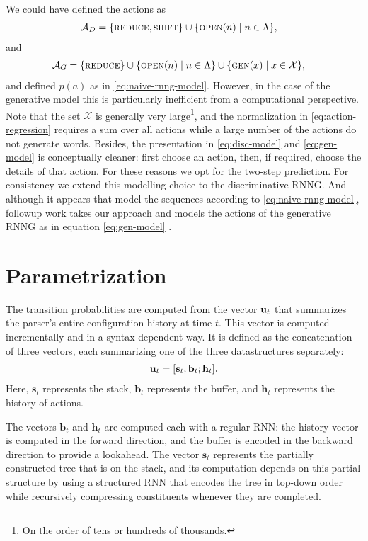 \begin{remark} We could have defined the actions as
  \begin{align*}
    \mathcal{A}_D &= \{ \textsc{reduce}, \textsc{shift} \} \cup \{ \textsc{open}(n) \mid n \in \Lambda \},
  \end{align*}
  and
  \begin{align*}
    \mathcal{A}_G &= \{ \textsc{reduce} \} \cup \{ \textsc{open}(n) \mid n \in \Lambda \} \cup \{ \textsc{gen}(x) \mid x \in \mathcal{X} \},
  \end{align*}
  and defined $p(a)$ as in \ref{eq:naive-rnng-model}. However, in the case of the generative model this is particularly inefficient from a computational perspective. Note that the set $\mathcal{X}$ is generally very large\footnote{On the order of tens or hundreds of thousands.}, and the normalization in \ref{eq:action-regression} requires a sum over all actions while a large number of the actions do not generate words. Besides, the presentation in \ref{eq:disc-model} and \ref{eq:gen-model} is conceptually cleaner: first choose an action, then, if required, choose the details of that action. For these reasons we opt for the two-step prediction. For consistency we extend this modelling choice to the discriminative RNNG. And although it appears that \citet{dyer2016rnng} model the sequences according to \ref{eq:naive-rnng-model}, followup work takes our approach and models the actions of the generative RNNG as in equation \ref{eq:gen-model} \citep{hale2018beam}.
\end{remark}


\section{Parametrization}
The transition probabilities are computed from the vector $\mathbf{u}_t$ that summarizes the parser's entire configuration history at time $t$. This vector is computed incrementally and in a syntax-dependent way. It is defined as the concatenation of three vectors, each summarizing one of the three datastructures separately:
\begin{align*}
  \mathbf{u}_t = [\mathbf{s}_t; \mathbf{b}_t; \mathbf{h}_t].
\end{align*}
Here, $\mathbf{s}_t$ represents the stack, $\mathbf{b}_t$ represents the buffer, and $\mathbf{h}_t$ represents the history of actions.

The vectors $\mathbf{b}_t$ and $\mathbf{h}_t$ are computed each with a regular RNN: the history vector is computed in the forward direction, and the buffer is encoded in the backward direction to provide a lookahead. The vector $\mathbf{s}_t$ represents the partially constructed tree that is on the stack, and its computation depends on this partial structure by using a structured RNN that encodes the tree in top-down order while recursively compressing constituents whenever they are completed.

